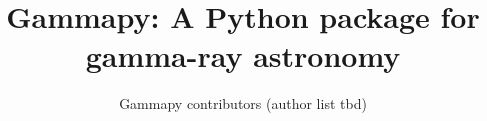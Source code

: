 \title{Gammapy: A Python package for gamma-ray astronomy}


\author{
Gammapy contributors (author list tbd)
}

\institute{
}




